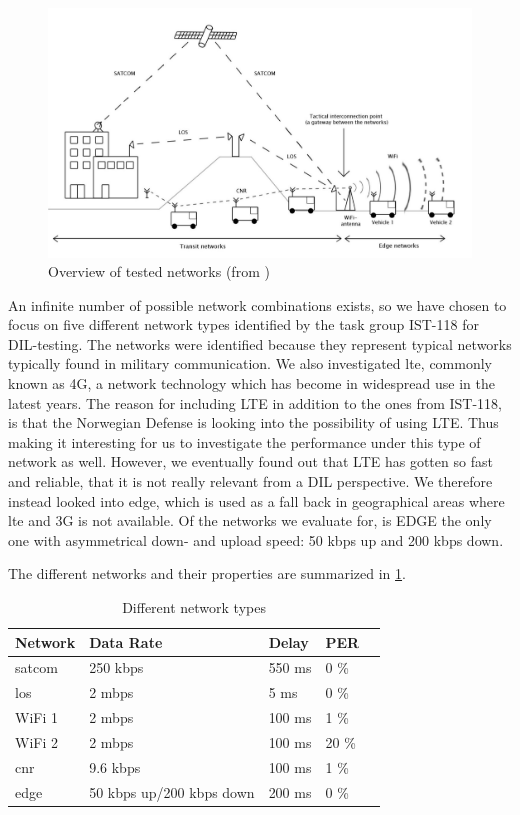 \begin{figure}[h]
\includegraphics[scale=0.25]{images/networks_overview.pdf}
\caption{Overview of tested networks (from \cite{krog-pisa})}
\label{figure-networks-overview}
\end{figure}

An infinite number of possible network combinations exists, so we have chosen to
focus on five different network types identified by the task group IST-118 for
DIL-testing. The networks were identified because they represent typical
networks typically found in military communication. We also investigated
\gls{lte}, commonly known as 4G, a network technology which has become in
widespread use in the latest years. The reason for including LTE in addition to
the ones from IST-118, is that the Norwegian Defense is looking into the
possibility of using LTE. Thus making it interesting for us to investigate the
performance under this type of network as well. However, we eventually found out
that LTE has gotten so fast and reliable, that it is not really relevant from a
DIL perspective. We therefore instead looked into \gls{edge}, which is used as a
fall back in geographical areas where \gls{lte} and 3G is not available. Of the
networks we evaluate for, is EDGE the only one with asymmetrical down- and
upload speed: 50 kbps up and 200 kbps down.

The different networks and their properties are summarized in
\cref{table-network-types}.

\begin{table}[h]
\begin{tabular}{| l | l | l | l | l |}
\hline
  \textbf{Network} & \textbf{Data Rate} & \textbf{Delay} & \textbf{PER} \\ \hline
  \gls{satcom} & 250 kbps & 550 ms & 0 \% \\ \hline
  \gls{los} & 2 mbps & 5 ms & 0 \% \\ \hline
  WiFi 1 & 2 mbps & 100 ms & 1 \% \\ \hline
  WiFi 2 & 2 mbps & 100 ms & 20 \% \\ \hline
  \gls{cnr} & 9.6 kbps & 100 ms & 1 \% \\ \hline
  \gls{edge} & 50 kbps up/200 kbps down & 200 ms & 0 \% \\ \hline
\end{tabular}
\caption{Different network types}
\label{table-network-types}
\end{table}


